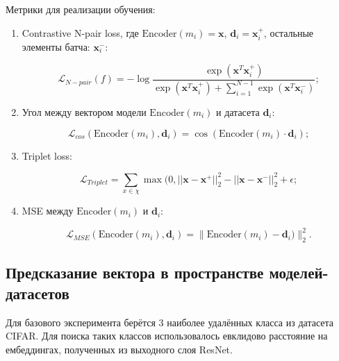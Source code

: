 \documentclass[a4paper, 14pt]{article}
\begin{document}
Метрики для реализации обучения:

\begin{enumerate}
    \item Contrastive N-pair loss, где $\text{Encoder}(m_i) = \textbf{x}$, $\textbf{d}_i = \textbf{x}_i^+$, остальные элементы батча: $\textbf{x}_i^-$:

\[\mathcal{L}_{N-pair}(f) = - \log \frac{\exp(\textbf{x}^T \textbf{x}_i^+)}{\exp(\textbf{x}^T \textbf{x}_i^+) + \sum _{i=1}^{N-1} \exp(\textbf{x}^T\textbf{x}_i^-)};\]
    \item Угол между вектором модели $\text{Encoder}(m_i)$ и датасета $\textbf{d}_i$:

\[\mathcal{L}_{cos}(\text{Encoder}(m_i), \textbf{d}_i) = \cos(\text{Encoder}(m_i) \cdot \textbf{d}_i);\]

    \item Triplet loss:

\[\mathcal{L}_{Triplet} = \sum\limits_{x \in \chi}\max(0, ||\textbf{x} - \textbf{x}^+||_2^2 - ||\textbf{x} - \textbf{x}^-||_2^2 + \epsilon;\]

    \item MSE между $\text{Encoder}(m_i)$ и $\textbf{d}_i$:

\[\mathcal{L}_{MSE}(\text{Encoder}(m_i), \textbf{d}_i) = \|\text{Encoder}(m_i) - \textbf{d}_i)\|_2^2.\]
\end{enumerate}

\subsection{Предсказание вектора в пространстве моделей-датасетов}

Для базового эксперимента берётся 3 наиболее удалённых класса из датасета CIFAR. Для поиска таких классов использовалось евклидово расстояние на ембеддингах, полученных из выходного слоя ResNet.
\end{document}
